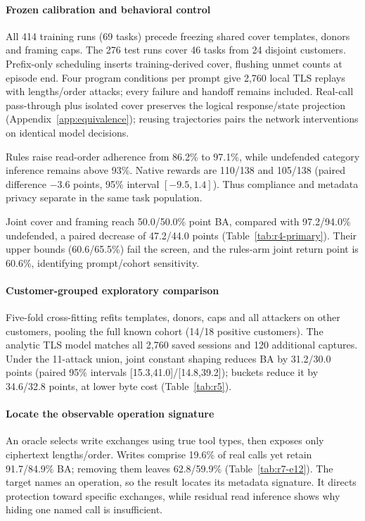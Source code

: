 \paragraph{Frozen calibration and behavioral control}
All 414 training runs (69 tasks) precede freezing shared cover templates, donors and framing caps. The 276 test runs cover 46 tasks from 24 disjoint customers. Prefix-only scheduling inserts training-derived cover, flushing unmet counts at episode end. Four program conditions per prompt give 2,760 local TLS replays with lengths/order attacks; every failure and handoff remains included. Real-call pass-through plus isolated cover preserves the logical response/state projection (Appendix~\ref{app:equivalence}); reusing trajectories pairs the network interventions on identical model decisions.

Rules raise read-order adherence from 86.2\% to 97.1\%, while undefended category inference remains above 93\%. Native rewards are 110/138 and 105/138 (paired difference $-3.6$ points, 95\% interval $[-9.5,1.4]$). Thus compliance and metadata privacy separate in the same task population.

Joint cover and framing reach 50.0/50.0\% point BA, compared with 97.2/94.0\% undefended, a paired decrease of 47.2/44.0 points (Table~\ref{tab:r4-primary}). Their upper bounds (60.6/65.5\%) fail the screen, and the rules-arm joint return point is 60.6\%, identifying prompt/cohort sensitivity.

\paragraph{Customer-grouped exploratory comparison}
Five-fold cross-fitting refits templates, donors, caps and all attackers on other customers, pooling the full known cohort (14/18 positive customers). The analytic TLS model matches all 2,760 saved sessions and 120 additional captures. Under the 11-attack union, joint constant shaping reduces BA by 31.2/30.0 points (paired 95\% intervals [15.3,41.0]/[14.8,39.2]); buckets reduce it by 34.6/32.8 points, at lower byte cost (Table~\ref{tab:r5}).


\paragraph{Locate the observable operation signature}
An oracle selects write exchanges using true tool types, then exposes only ciphertext lengths/order. Writes comprise 19.6\% of real calls yet retain 91.7/84.9\% BA; removing them leaves 62.8/59.9\% (Table~\ref{tab:r7-e12}). The target names an operation, so the result locates its metadata signature. It directs protection toward specific exchanges, while residual read inference shows why hiding one named call is insufficient.



